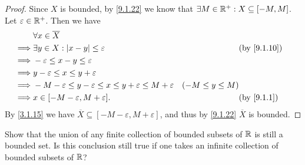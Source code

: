 \begin{proof}
  Since \(X\) is bounded, by \cref{9.1.22} we know that \(\exists M \in \mathbb{R}^+ : X \subseteq [-M, M]\).
  Let \(\varepsilon \in \mathbb{R}^+\).
  Then we have
  \begin{align*}
             & \forall x \in \overline{X}                                                                                                \\
    \implies & \exists y \in X : \abs{x - y} \leq \varepsilon                                         &                    & \by{9.1.10} \\
    \implies & -\varepsilon \leq x - y \leq \varepsilon                                                                                  \\
    \implies & y - \varepsilon \leq x \leq y + \varepsilon                                                                               \\
    \implies & -M - \varepsilon \leq y - \varepsilon \leq x \leq y + \varepsilon \leq M + \varepsilon & (-M \leq y \leq M)               \\
    \implies & x \in [-M - \varepsilon, M + \varepsilon].                                             &                    & \by{9.1.1}
  \end{align*}
  By \cref{3.1.15} we have \(\overline{X} \subseteq [-M - \varepsilon, M + \varepsilon]\), and thus by \cref{9.1.22} \(\overline{X}\) is bounded.
\end{proof}

\begin{ex}\label{ex:9.1.12}
  Show that the union of any finite collection of bounded subsets of \(\mathbb{R}\) is still a bounded set.
  Is this conclusion still true if one takes an infinite collection of bounded subsets of \(\mathbb{R}\)?
\end{ex}

